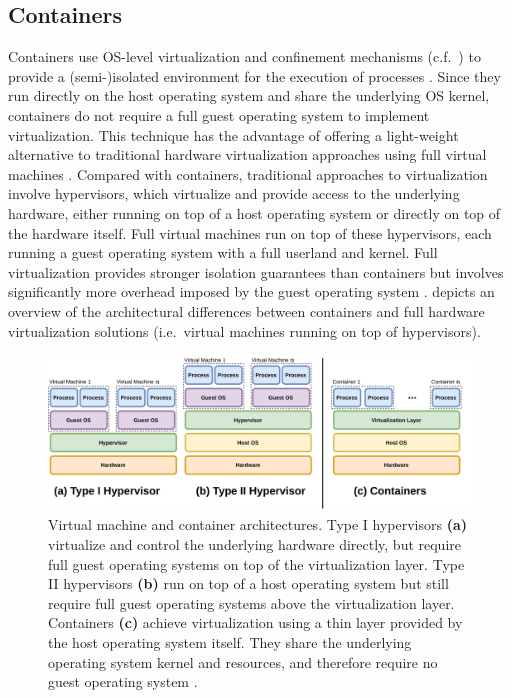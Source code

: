 \subsection{Containers}
\label{subsection:containers}

Containers use OS-level virtualization and confinement mechanisms (c.f.~) to provide a (semi-)isolated environment for the execution of processes \cite{sultan2019_container_security}. Since they run directly on the host operating system and share the underlying OS kernel, containers do not require a full guest operating system to implement virtualization. This technique has the advantage of offering a light-weight alternative to traditional hardware virtualization approaches using full virtual machines \cite{sultan2019_container_security}. Compared with containers, traditional approaches to virtualization involve hypervisors, which virtualize and provide access to the underlying hardware, either running on top of a host operating system or directly on top of the hardware itself. Full virtual machines run on top of these hypervisors, each running a guest operating system with a full userland and kernel. Full virtualization provides stronger isolation guarantees than containers but involves significantly more overhead imposed by the guest operating system \cite{sultan2019_container_security}.  depicts an overview of the architectural differences between containers and full hardware virtualization solutions (i.e.~virtual machines running on top of hypervisors).

\begin{figure}[htb]
  \centering
  \includegraphics[width=1\linewidth]{figs/virtualization.pdf}
  \caption{
    Virtual machine and container architectures. Type I hypervisors \textbf{(a)} virtualize and control the underlying hardware directly, but require full guest operating systems on top of the virtualization layer. Type II hypervisors \textbf{(b)} run on top of a host operating system but still require full guest operating systems above the virtualization layer. Containers \textbf{(c)} achieve virtualization using a thin layer provided by the host operating system itself. They share the underlying operating system kernel and resources, and therefore require no guest operating system \cite{sultan2019_container_security}.
  }%
  \label{fig:virt}
\end{figure}

